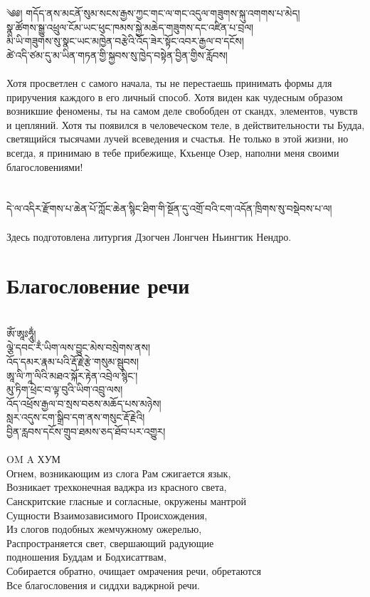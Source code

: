 \small
\ti
༄༅། གདོད་ནས་མངནོ་སུམ་སངས་རྒྱས་ཀྱང་གང་ལ་གང་འདུལ་གཟུགས་སྐུ་འགགས་པ་མེད།\\
སྣ་ཚོགས་སྒྱུ་འཕྲུལ་ངོམ་ཡང་ཕུང་ཁམས་སྐྱེ་མཆེད་གཟུགས་དང་འཛིན་པ་བྲལ།\\
མི་ཡི་གཟུགས་སུ་སྣང་ཡང་མཁྱེན་བརྩེའི་འོད་ཟེར་སྟོང་འབར་རྒྱལ་བ་དངོས།\\
ཚེ་འདི་ཙམ་དུ་མ་ཡིན་གཏན་གྱི་སྐྱབས་སུ་ཁྱེད་བསྟེན་བྱིན་གྱིས་རློབས།\\
\\
\ru
Хотя просветлен с самого начала, ты не перестаешь принимать
формы для приручения каждого в его личный способ.
Хотя виден как чудесным образом возникшие феномены,
ты на самом деле свобобден от скандх, элементов, чувств и цепляний.
Хотя ты появился в человеческом теле, в действительности ты Будда,
светящийся тысячами лучей всеведения и счастья.
Не только в этой жизни, но всегда, я принимаю в тебе прибежище,
Кхьенце Озер, наполни меня своими благословениями!\\
\\
\vspace{0.5cm}
\\
\scriptsize
\ti དེ་ལ་འདིར་རྫོགས་པ་ཆེན་པོ་ཀློང་ཆེན་སྙིང་ཐིག་གི་སྔོན་དུ་འགྲོ་བའི་ངག་འདོན་ཁྲིགས་སུ་བསྡེབས་པ་ལ།\\
\\
\ru Здесь подготовлена литургия Дзогчен Лонгчен Ньингтик Нендро.\\


\normalsize
\newpage
\section*{Благословение речи}
\\
\ti
ཨོཾ་ཨཱཿཧཱུྂ།\\
ལྕེ་དབང་རྂ་ཡིག་ལས་བྱུང་མེས་བསྲེགས་ནས། \\
འོད་དམར་རྣམ་པའི་རྡོ་རྗེ་རྩེ་གསུམ་སྦུབས།\\
ཨཱ་ལི་ཀཱ་ལིའི་མཐའ་སྐོར་རྟེན་འབྲེལ་སྙིང་།\\
མུ་ཏིག་ཕྲེང་བ་ལྟ་བུའི་ཡིག་འབྲུ་ལས།\\
འོད་འཕྲོས་རྒྱལ་བ་སྲས་བཅས་མཆོད་པས་མཉེས།\\
སླར་འདུས་ངག་སྒྲིབ་དག་ནས་གསུང་རྡོ་རྗེའི།\\
བྱིན་རླབས་དངོས་གྲུབ་ཐམས་ཅད་ཐོབ་པར་འགྱུར།\\
\\
\ru
OM A ХУМ \\
Огнем, возникающим из слога Рам сжигается язык,\\
Возникает трехконечная ваджра из красного света,\\
Санскритские гласные и согласные, окружены мантрой\\
Сущности Взаимозависимого Происхождения,\\
Из слогов подобных жемчужному ожерелью,\\
Распространяется свет, свершающий радующие \\
подношения Буддам и Бодхисаттвам,\\
Собирается обратно, очищает омрачения речи, обретаются\\
Все благословения и сиддхи ваджрной речи.
\newpage
